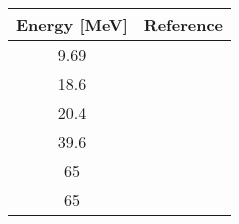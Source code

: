 \begin{tabular}{c c} 
    \toprule 
    \bf{Energy [MeV]} & \bf{Reference} \\
    \midrule
    9.69 & \cite{Greenlees71}\\
    18.6 & \cite{Kossanyi-Demay67}\\
    20.4 & \cite{Wassenaar89}\\
    39.6 & \cite{Liers70}\\
    65 & \cite{Noro81}\\
    65 & \cite{Sakaguchi81}\\
    \bottomrule
\end{tabular}
